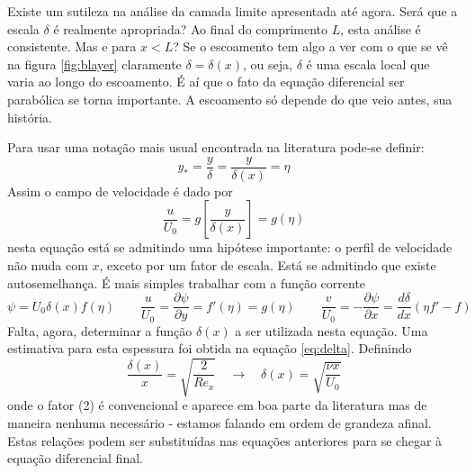 \documentclass[article,12pt,oneside,a4paper,english,brazil,sumario=tradicional]{abntex2}
\newcommand{\lra}{\ensuremath{\longrightarrow}}
\newcommand{\qrq}{\ensuremath{\quad\lra\quad}}
\begin{document}
Existe um sutileza na análise da camada limite apresentada até agora. Será que a escala $\delta$ é realmente apropriada? Ao final do comprimento $L$, esta análise é consistente. Mas e para $x < L$? Se o escoamento tem algo a ver com o que se vê na figura \ref{fig:blayer} claramente $\delta = \delta(x)$, ou seja, $\delta$ é uma escala local que varia ao longo do escoamento. É aí que o fato da equação diferencial ser parabólica se torna importante. A escoamento só depende do que veio antes, sua história. 

Para usar uma notação mais usual encontrada na literatura pode-se definir:
\[
y_* = \frac{y}{\delta} = \frac{y}{\delta(x)} = \eta
\]
Assim o campo de velocidade é dado por
\[
\frac{u}{U_0} = g\left[\frac{y}{\delta(x)}\right] = g(\eta)
\]
nesta equação está se admitindo uma hipótese importante: o perfil de velocidade não muda com $x$, exceto por um fator de escala. Está se admitindo que existe autosemelhança. É mais simples trabalhar com a função corrente
\[
\psi = U_0 \delta(x) f(\eta) \qquad \frac{u}{U_0} = \frac{\partial\psi}{\partial y}=f'(\eta)=g(\eta) \qquad \frac{v}{U_0} =-\frac{\partial\psi}{\partial x} = \frac{d\delta}{dx}\left(\eta f' - f\right)
\]
Falta, agora, determinar a função $\delta(x)$ a ser utilizada nesta equação. Uma estimativa para esta espessura foi obtida na equação \ref{eq:delta}. Definindo 
\begin{equation}
  \frac{\delta(x)}{x} = \sqrt{\frac{2}{Re_x}} \qrq \delta(x) = \sqrt{\frac{\nu x}{U_0}}
  \label{eq:delta2}
\end{equation}
onde o fator (2) é convencional e aparece em boa parte da literatura mas de maneira nenhuma necessário - estamos falando em ordem de grandeza afinal. Estas relações podem ser substituídas nas equações anteriores para se chegar à equação diferencial final.
\end{document}
